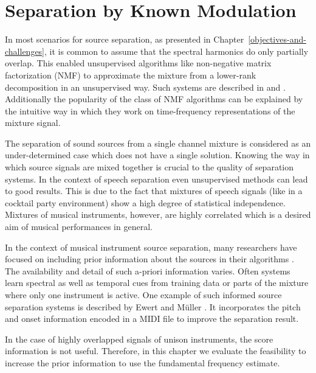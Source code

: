 \chapter{Separation by Known Modulation}


In most scenarios for source separation, as presented in Chapter~\ref{objectives-and-challenges}, it is common to assume that the spectral harmonics do only partially overlap.
This enabled unsupervised algorithms like non-negative matrix factorization (NMF) to approximate the mixture from a lower-rank decomposition in an unsupervised way.
Such systems are described in \cite{smaragdis03} and \cite{virtanen07}.
Additionally the popularity of the class of NMF algorithms can be explained by the intuitive way in which they work on time-frequency representations of the mixture signal.

The separation of sound sources from a single channel mixture is considered as an under-determined case which does not have a single solution. Knowing the way in which source signals are mixed together is crucial to the quality of separation systems. In the context of speech separation even unsupervised methods can lead to good results. This is due to the fact that mixtures of speech signals (like in a cocktail party environment) show a high degree of statistical independence. Mixtures of musical instruments, however, are highly correlated which is a desired aim of musical performances in general.

In the context of musical instrument source separation, many researchers have focused on including prior information about the sources in their algorithms \cite{ozerov12}.
The availability and detail of such a-priori information varies. Often systems learn spectral as well as temporal cues from training data or parts of the mixture where only one instrument is active.
One example of such informed source separation systems is described by Ewert and M\"uller \cite{ewert12}.
It incorporates the pitch and onset information encoded in a MIDI file to improve the separation result.

In the case of highly overlapped signals of unison instruments, the score information is not useful.
Therefore, in this chapter we evaluate the feasibility to increase the prior information to use the fundamental frequency estimate.

